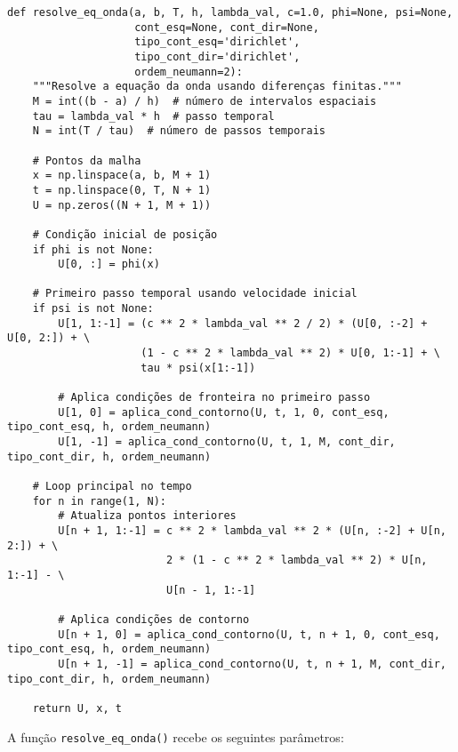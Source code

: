 \documentclass[column,amsmath,amssymb,floatfix]{revtex4}
\begin{document}
\begin{lstlisting}
def resolve_eq_onda(a, b, T, h, lambda_val, c=1.0, phi=None, psi=None,
                    cont_esq=None, cont_dir=None,
                    tipo_cont_esq='dirichlet',
                    tipo_cont_dir='dirichlet',
                    ordem_neumann=2):
    """Resolve a equação da onda usando diferenças finitas."""
    M = int((b - a) / h)  # número de intervalos espaciais
    tau = lambda_val * h  # passo temporal
    N = int(T / tau)  # número de passos temporais

    # Pontos da malha
    x = np.linspace(a, b, M + 1)
    t = np.linspace(0, T, N + 1)
    U = np.zeros((N + 1, M + 1))

    # Condição inicial de posição
    if phi is not None:
        U[0, :] = phi(x)

    # Primeiro passo temporal usando velocidade inicial
    if psi is not None:
        U[1, 1:-1] = (c ** 2 * lambda_val ** 2 / 2) * (U[0, :-2] + U[0, 2:]) + \
                     (1 - c ** 2 * lambda_val ** 2) * U[0, 1:-1] + \
                     tau * psi(x[1:-1])

        # Aplica condições de fronteira no primeiro passo
        U[1, 0] = aplica_cond_contorno(U, t, 1, 0, cont_esq, tipo_cont_esq, h, ordem_neumann)
        U[1, -1] = aplica_cond_contorno(U, t, 1, M, cont_dir, tipo_cont_dir, h, ordem_neumann)

    # Loop principal no tempo
    for n in range(1, N):
        # Atualiza pontos interiores
        U[n + 1, 1:-1] = c ** 2 * lambda_val ** 2 * (U[n, :-2] + U[n, 2:]) + \
                         2 * (1 - c ** 2 * lambda_val ** 2) * U[n, 1:-1] - \
                         U[n - 1, 1:-1]

        # Aplica condições de contorno
        U[n + 1, 0] = aplica_cond_contorno(U, t, n + 1, 0, cont_esq, tipo_cont_esq, h, ordem_neumann)
        U[n + 1, -1] = aplica_cond_contorno(U, t, n + 1, M, cont_dir, tipo_cont_dir, h, ordem_neumann)

    return U, x, t
\end{lstlisting}
 A função \texttt{resolve\_eq\_onda()} recebe os seguintes parâmetros:
\end{document}
